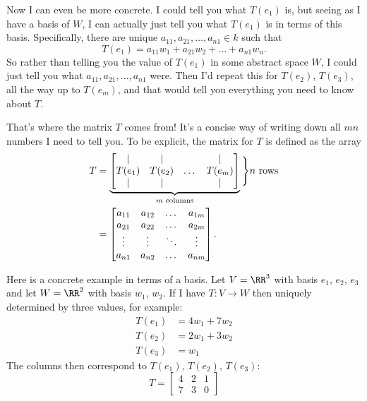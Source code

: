 Now I can even be more concrete.
I could tell you what $T(e_1)$ is, but seeing as I have a basis of $W$,
I can actually just tell you what $T(e_1)$ is in terms of this basis.
Specifically, there are unique $a_{11}, a_{21}, \dots, a_{n1} \in k$ such that
\[ T(e_1) = a_{11} w_1 + a_{21} w_2 + \dots + a_{n1} w_n. \]
So rather than telling you the value of $T(e_1)$ in some abstract space $W$,
I could just tell you what $a_{11}, a_{21}, \dots, a_{n1}$ were.
Then I'd repeat this for $T(e_2)$, $T(e_3)$, all the way up to $T(e_m)$,
and that would tell you everything you need to know about $T$.

That's where the matrix $T$ comes from!
It's a concise way of writing down all $mn$ numbers
I need to tell you.
To be explicit, the matrix for $T$ is defined as the array
\begin{align*}
	T &= \underbrace{%
	\begin{bmatrix}
		\mid & \mid & & \mid \\
		T(e_1) & T(e_2) & \dots & T(e_{m}) \\
		\mid & \mid & & \mid \\
	\end{bmatrix}
	}_{\text{$m$ columns}} \Bigg\} \text{$n$ rows} \\
	&=
	\begin{bmatrix}
		a_{11} & a_{12} & \dots & a_{1m} \\
		a_{21} & a_{22} & \dots & a_{2m} \\
		\vdots & \vdots & \ddots & \vdots \\
		a_{n1} & a_{n2} & \dots & a_{nm}
	\end{bmatrix}.
\end{align*}

\begin{example}
	Here is a concrete example in terms of a basis.
	Let $V = \RR^3$ with basis $e_1$, $e_2$, $e_3$
	and let $W = \RR^2$ with basis $w_1$, $w_2$.
	If I have $T \colon V \to W$
	then uniquely determined by three values, for example:
	\begin{align*}
		T(e_1) &= 4w_1 + 7w_2 \\
		T(e_2) &= 2w_1 + 3w_2 \\
		T(e_3) &= w_1
	\end{align*}
	The columns then correspond to $T(e_1)$, $T(e_2)$, $T(e_3)$:
	\[
		T =
		\begin{bmatrix}
			4 & 2 & 1 \\
			7 & 3 & 0
		\end{bmatrix}
	\]
\end{example}

